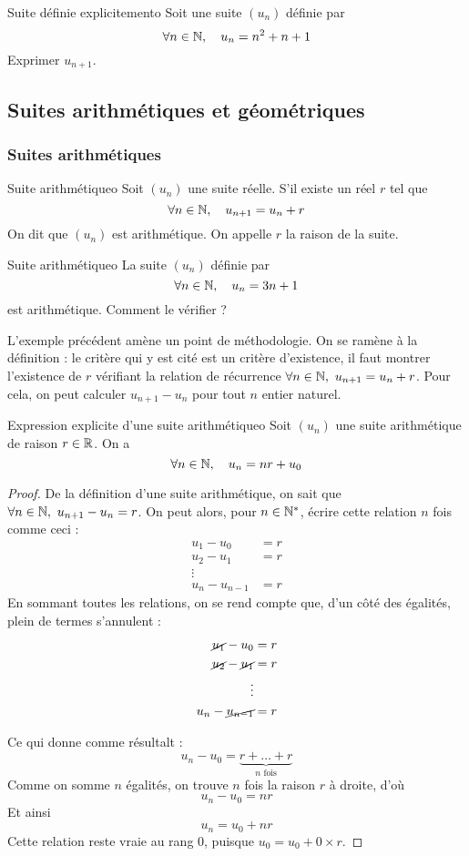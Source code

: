 \begin{exemple}{Suite définie explicitement}{o}
Soit une suite $(u_n)$ définie par \[\forall n\in\mathbb{N},\quad u_n=n^2+n+1\]
Exprimer $u_{n+1}$.
\end{exemple}

\subsection{Suites arithmétiques et géométriques}
\subsubsection{Suites arithmétiques}
\begin{definition}{Suite arithmétique}{o}
Soit $(u_n)$ une suite réelle. S'il existe un réel $r$ tel que \[\forall n\in\mathbb{N},\quad u_{n+1}=u_n+r\]
On dit que $(u_n)$ est arithmétique. On appelle $r$ la raison de la suite.
\end{definition}

\begin{exemple}{Suite arithmétique}{o}
La suite $(u_n)$ définie par \[\forall n\in\mathbb{N},\quad u_n=3n+1\] est arithmétique. Comment le vérifier ?
\end{exemple}

L'exemple précédent amène un point de méthodologie. On se ramène à la définition : le critère qui y est cité est un critère d'existence, il faut montrer l'existence de $r$ vérifiant la relation de récurrence $\forall n\in\mathbb{N},\ u_{n+1}=u_n+r$. Pour cela, on peut calculer $u_{n+1}-u_n$ pour tout $n$ entier naturel.

\begin{proposition}{Expression explicite d'une suite arithmétique}{o}
Soit $(u_n)$ une suite arithmétique de raison $r\in\mathbb{R}$. On a \[\forall n\in\mathbb{N},\quad u_n=nr+u_0\]
\end{proposition}

\begin{proof}
	De la définition d'une suite arithmétique, on sait que $\forall n\in\mathbb{N},\ u_{n+1}-u_n=r$. On peut alors, pour $n\in\mathbb{N}^*$, écrire cette relation $n$ fois comme ceci : 
	\begin{align*}
		u_1-u_0 &= r\\
		u_2-u_1 &= r\\
		\vdots\\
		u_n-u_{n-1} &= r
	\end{align*}
	En sommant toutes les relations, on se rend compte que, d'un côté des égalités, plein de termes s'annulent :
	\begin{align*}
		\cancel{u_1}-u_0 &= r\\
		\cancel{u_2}-\cancel{u_1} &= r\\
		\vdots\\
		u_n-\cancel{u_{n-1}} &= r
	\end{align*}

	Ce qui donne comme résultalt : \[u_n-u_0=\underbrace{r+\dots+r}_{n\text{ fois}}\]
	Comme on somme $n$ égalités, on trouve $n$ fois la raison $r$ à droite, d'où \[u_n-u_0=nr\]
	Et ainsi \[u_n=u_0+nr\]
	Cette relation reste vraie au rang $0$, puisque $u_0=u_0+0\times r$.
\end{proof}

